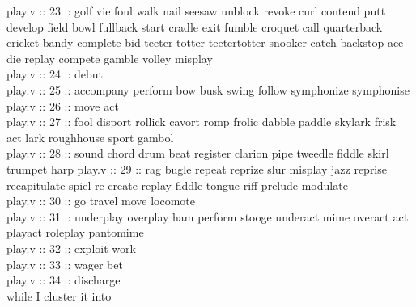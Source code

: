 \documentclass[12pt]{article}
\begin{document}
\begin{itemize}
	play.v :: 23 :: golf vie foul walk nail seesaw unblock revoke curl contend putt develop field bowl fullback start cradle exit fumble croquet call quarterback cricket bandy complete bid teeter-totter teetertotter snooker catch backstop ace die replay compete gamble volley misplay \\
	play.v :: 24 :: debut \\
	play.v :: 25 :: accompany perform bow busk swing follow symphonize symphonise \\
	play.v :: 26 :: move act \\
	play.v :: 27 :: fool disport rollick cavort romp frolic dabble paddle skylark frisk act lark roughhouse sport gambol \\
	play.v :: 28 :: sound chord drum beat register clarion pipe tweedle fiddle skirl trumpet harp
	play.v :: 29 :: rag bugle repeat reprize slur misplay jazz reprise recapitulate spiel re-create replay fiddle tongue riff prelude modulate \\
	play.v :: 30 :: go travel move locomote \\
	play.v :: 31 :: underplay overplay ham perform stooge underact mime overact act playact roleplay pantomime \\
	play.v :: 32 :: exploit work \\
	play.v :: 33 :: wager bet \\
	play.v :: 34 :: discharge \\
	
	while I cluster it into
	

\end{itemize}
\end{document}
